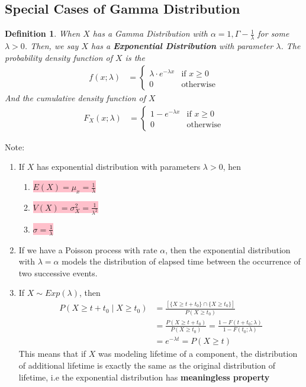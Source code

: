 \documentclass[11pt,oneside]{book}
\theoremstyle{newStyle}
\newtheorem{defn}[thm]{Definition}
\newcommand{\note}{\color{red}Note: \color{black}}
\begin{document}
\subsection[Special Cases of Gamma Distribution]{Special Cases of Gamma Distribution}
\begin{defn}
When $X$ has a Gamma Distribution with $\alpha=1,\Gamma-\frac{1}{\lambda}$ for some $\lambda>0$. Then, we say $X$ has a \textbf{Exponential Distribution} with parameter $\lambda$. The probability density function of $X$ is the \begin{align*}
f(x;\lambda)&=\begin{cases}
\lambda \cdot e^{-\lambda x}&\text{if }x\geq 0\\
0&\text{otherwise}
\end{cases}
\end{align*}
And the cumulative density function of $X$ \begin{align*}
F_X(x;\lambda)&=\begin{cases}
1-e^{-\lambda x}&\text{if }x\geq 0\\
0&\text{otherwise}
\end{cases}
\end{align*}
\end{defn}
\note \begin{enumerate}
\item If $X$ has exponential distribution with parameters $\lambda>0$, hen \begin{enumerate}
\item \colorbox{pink}{$E(X)=\mu_x=\frac{1}{\lambda}$}
\item \colorbox{pink}{$V(X)=\sigma_X^2=\frac{1}{\lambda^2}$}
\item \colorbox{pink}{$\sigma=\frac{1}{\lambda}$}
\end{enumerate}
\item If we have a Poisson process with rate $\alpha$, then the exponential distribution with $\lambda=\alpha$ models the distribution of elapsed time between the occurrence of two successive events.
\item If $X\sim Exp(\lambda)$, then \begin{align*}
P(X\geq t+t_0\mid X\geq t_0)&=\frac{[\{X\geq t+t_0\}\cap\{X\geq t_0\} ]}{P(X\geq t_0)}\\
&=\frac{P(X\geq t+t_0)}{P(X\geq t_0)}=\frac{1-F(t+t_0;\lambda)}{1-F(t_0;\lambda)}\\
&=e^{-\lambda t}=P(X\geq t)
\end{align*}
This means that if $X$ was modeling lifetime of a component, the distribution of additional lifetime is exactly the same as the original distribution of lifetime, i.e the exponential distribution has \textbf{meaningless property}  
\end{enumerate}
\end{document}
